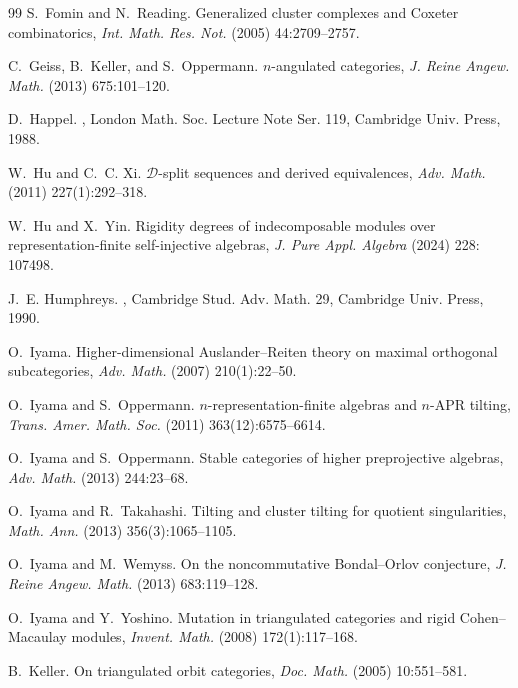 \documentclass[12pt]{article}
\theoremstyle{plain}
\theoremstyle{definition}
\begin{document}
\begin{thebibliography}{99}
S.~Fomin and N.~Reading.
\newblock Generalized cluster complexes and Coxeter combinatorics,
{\em Int. Math. Res. Not.} (2005) 44:2709--2757.

C.~Geiss, B.~Keller, and S.~Oppermann.
\newblock \(n\)-angulated categories,
{\em J. Reine Angew. Math.} (2013) 675:101--120.

D.~Happel.
, London Math. Soc. Lecture Note Ser. 119, Cambridge
Univ. Press, 1988.

W.~Hu and C.~C. Xi.
\newblock \(\mathcal D\)-split sequences and derived equivalences,
{\em Adv. Math.} (2011) 227(1):292--318.

W.~Hu and X.~Yin.
\newblock Rigidity degrees of indecomposable modules over representation-finite
self-injective algebras, {\em J. Pure Appl. Algebra}  (2024) 228: 107498.

J.~E. Humphreys.
, Cambridge Stud. Adv.
Math. 29, Cambridge Univ. Press, 1990.

O.~Iyama.
\newblock Higher-dimensional Auslander--Reiten theory on maximal orthogonal
subcategories, {\em Adv. Math.} (2007) 210(1):22--50.

O.~Iyama and S.~Oppermann.
\newblock \(n\)-representation-finite algebras and \(n\)-APR tilting,
{\em Trans. Amer. Math. Soc.} (2011) 363(12):6575--6614.

O.~Iyama and S.~Oppermann.
\newblock Stable categories of higher preprojective algebras,
{\em Adv. Math.} (2013) 244:23--68.

O.~Iyama and R.~Takahashi.
\newblock Tilting and cluster tilting for quotient singularities,
{\em Math. Ann.} (2013) 356(3):1065--1105.

O.~Iyama and M.~Wemyss.
\newblock On the noncommutative Bondal--Orlov conjecture,
{\em J. Reine Angew. Math.} (2013) 683:119--128.

O.~Iyama and Y.~Yoshino.
\newblock Mutation in triangulated categories and rigid Cohen--Macaulay
modules, {\em Invent. Math.} (2008) 172(1):117--168.

B.~Keller.
\newblock On triangulated orbit categories,
{\em Doc. Math.} (2005) 10:551--581.


\end{thebibliography}
\end{document}
